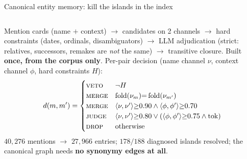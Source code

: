 \documentclass[aspectratio=169,10pt]{beamer}
\begin{document}
\begin{frame}{Canonical entity memory: kill the islands in the index}
\begin{columns}[T]
\centering
{}
\vspace{1mm}

\footnotesize Mention cards (name $+$ context) $\to$ candidates on 2
channels $\to$ hard constraints (dates, ordinals, disambiguators) $\to$
LLM adjudication (strict: relatives, successors, remakes are \emph{not} the
same) $\to$ transitive closure. Built \textbf{once, from the corpus only}.
Per-pair decision (name channel $\nu$, context channel $\phi$, hard
constraints $H$):
\[
d(m,m')=\begin{cases}
\textsc{veto} & \neg H\\
\textsc{merge} & \operatorname{fold}(\nu_m){=}\operatorname{fold}(\nu_{m'})\\
\textsc{merge} & \langle\nu,\nu'\rangle{\ge}0.90 \wedge \langle\phi,\phi'\rangle{\ge}0.70\\
\textsc{judge} & \langle\nu,\nu'\rangle{\ge}0.80 \vee (\langle\phi,\phi'\rangle{\ge}0.75 \wedge \text{tok})\\
\textsc{drop} & \text{otherwise}
\end{cases}
\]
\footnotesize $40{,}276$ mentions $\to$ $27{,}966$ entries; $178/188$
diagnosed islands resolved; the canonical graph needs \textbf{no synonymy
edges at all}.
\end{columns}
\end{frame}
\end{document}
